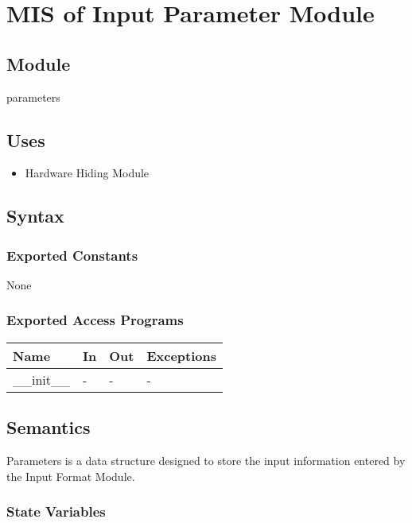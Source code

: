 \documentclass[12pt, titlepage]{article}
\begin{document}
\section{MIS of Input Parameter Module} \label{Input_Parameter_Module} 

\subsection{Module}

parameters

\subsection{Uses}

\begin{itemize}
    \item Hardware Hiding Module
\end{itemize}

\subsection{Syntax}

\subsubsection{Exported Constants}
None 

\subsubsection{Exported Access Programs}

\begin{center}
\begin{tabular}{p{2cm} p{4cm} p{4cm} p{2cm}}
\hline
\textbf{Name} & \textbf{In} & \textbf{Out} & \textbf{Exceptions} \\
\hline
\_\_init\_\_  & - & - & - \\
\hline
\end{tabular}
\end{center}

\subsection{Semantics}
Parameters is a data structure designed to store the input information entered by the Input Format Module. 
\subsubsection{State Variables}
\end{document}
